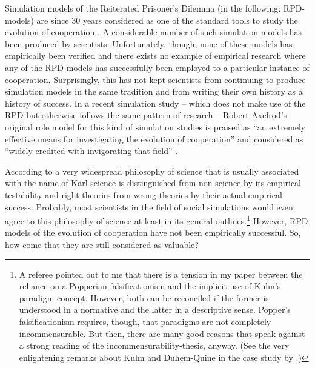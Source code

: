 \documentclass[graybox, English]{svmult}
\begin{document}
Simulation models of the Reiterated Prisoner's Dilemma (in the
following: RPD-models) are since 30 years considered as one of the
standard tools to study the evolution of cooperation
\citep{rangoni:2013} \citep{hoffmann:2000}. A considerable number
of such simulation models has been produced by
scientists. Unfortunately, though, none of these models has
empirically been verified and there exists no example of empirical
research where any of the RPD-models has successfully been employed to
a particular instance of cooperation. Surprisingly, this has not kept
scientists from continuing to produce simulation models in the same
tradition and from writing their own history as a history of
success. In a recent simulation study -- which does not make use of
the RPD but otherwise follows the same pattern of research -- Robert
Axelrod's \citep{axelrod:1984} original role model for this kind of
simulation studies is praised as ``an extremely effective means for
investigating the evolution of cooperation'' and considered as
``widely credited with invigorating that field''
\citep[208-209]{rendell-et-al:2010a}. 

According to a very widespread philosophy of science that is usually
associated with the name of Karl \citet{popper:1934} science is
distinguished from non-science by its empirical testability and right
theories from wrong theories by their actual empirical
success. Probably, most scientists in the field of social simulations
would even agree to this philosophy of science at least in its general
outlines.\footnote{A referee pointed out to me that there is a tension
  in my paper between the reliance on a Popperian falsificationism and
  the implicit use of Kuhn's paradigm concept. However, both can be
  reconciled if the former is understood in a normative and the latter
  in a descriptive sense. Popper's falsificationism requires, though,
  that paradigms are not completely incommensurable. But then, there
  are many good reasons that speak against a strong reading of the
  incommensurability-thesis, anyway. (See the very enlightening
  remarks about Kuhn and Duhem-Quine in the case study by
  \citet[11ff., 305ff.]{zacharias:2013}.)
} However, RPD models of the evolution of cooperation have not been empirically successful. So, how come that they are still
considered as valuable?
\end{document}
